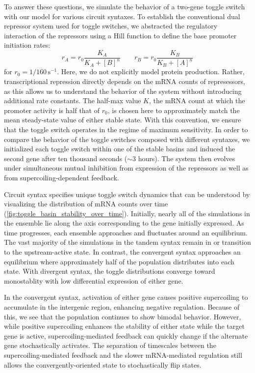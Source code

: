 \documentclass[11pt]{article}
\begin{document}
To answer these questions, we simulate the behavior of a two-gene toggle switch with our model for various circuit syntaxes. To establish the conventional dual repressor system used for toggle switches, we abstracted the regulatory interaction of the repressors using a Hill function to define the base promoter initiation rates:
\begin{equation}
    r_A = r_0 \frac{K_A}{K_A + [B]^n} \qquad r_B = r_0 \frac{K_B}{K_B + [A]^n}
\end{equation}
for \(r_0 = 1/160 \,\text{s}^{-1}\). Here, we do not explicitly model protein production. Rather, transcriptional repression directly depends on the mRNA counts of represessors, as this allows us to understand the behavior of the system without introducing additional rate constants. The half-max value \(K\), the mRNA count at which the promoter activity is half that of \(r_0\), is chosen here to approximately match the mean steady-state value of either stable state. With this convention, we ensure that the toggle switch operates in the regime of maximum sensitivity. In order to compare the behavior of the toggle switches composed with different syntaxes, we initialized each toggle switch within one of the stable basins and induced the second gene after ten thousand seconds (\(\sim3\) hours). The system then evolves under simultaneous mutual inhibition from expression of the repressors as well as from supercoiling-dependent feedback.

Circuit syntax specifies unique toggle switch dynamics that can be understood by visualizing the distribution of mRNA counts over time (\cref{fig:toggle_basin_stability_over_time}). Initially, nearly all of the simulations in the ensemble lie along the axis corresponding to the gene initially expressed. As time progresses, each ensemble approaches and fluctuates around an equilibrium.
The vast majority of the simulations in the tandem syntax remain in or transition to the upstream-active state. In contrast, the convergent syntax approaches an equilibrium where approximately half of the population distributes into each state. With divergent syntax, the toggle distributions converge toward monostablity with low differential expression of either gene.

In the convergent syntax, activation of either gene causes positive supercoiling to accumulate in the intergenic region, enhancing negative regulation. Because of this, we see that the population continues to show bimodal behavior. However, while positive supercoiling enhances the stability of either state while the target gene is active, supercoiling-mediated feedback can quickly change if the alternate gene stochastically activates. The separation of timescales between the supercoiling-mediated feedback and the slower mRNA-mediated regulation still allows the convergently-oriented state to stochastically flip states.
\end{document}
